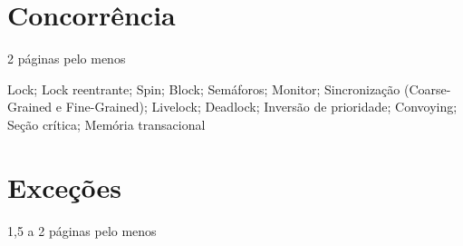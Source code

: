 \chapter{Concorrência}

2 páginas pelo menos

Lock; Lock reentrante; Spin; Block; Semáforos; Monitor;
Sincronização (Coarse-Grained e Fine-Grained); Livelock; Deadlock;
Inversão de prioridade; Convoying; Seção crítica; Memória transacional

\chapter{Exceções}

1,5 a 2 páginas pelo menos
